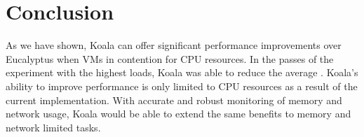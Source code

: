 \section{Conclusion}

As we have shown, Koala can offer significant performance improvements over Eucalyptus when VMs in contention for CPU resources.  In the passes of the experiment with the highest loads, Koala was able to reduce the average .  Koala's ability to improve performance is only limited to CPU resources as a result of the current implementation.  With accurate and robust monitoring of memory and network usage, Koala would be able to extend the same benefits to memory and network limited tasks.  